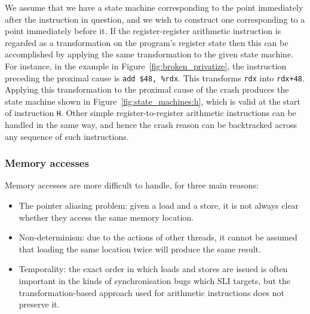 \documentclass[10pt,letter,twocolumn]{sigplanconf}
\newcommand{\editorial}[1]{}
\newcommand{\needCite}{\editorial{need cite}}
\begin{document}
We assume that we have a state machine corresponding to the point
immediately after the instruction in question, and we wish to
construct one corresponding to a point immediately before it.  If the
register-register arithmetic instruction is regarded as a
transformation on the program's register state then this can be
accomplished by applying the same transformation to the given state
machine.  For instance, in the example in
Figure~\ref{fig:broken_privatize}, the instruction preceding the
proximal cause is \verb|add $48, %rdx|.  This transforms \verb|rdx|
into \verb|rdx+48|.  Applying this transformation to the proximal
cause of the crash produces the state machine shown in
Figure~\ref{fig:state_machines:h}, which is valid at the start of
instruction \verb|H|.  Other simple register-to-register arithmetic
instructions can be handled in the same way, and hence the crash
reason can be backtracked across any sequence of such
instructions.\editorial{The reason this works is something to do with
  the underlying category of state machines being linear with respect
  to register-register instructions expressed as homomorphisms, but a)
  that's not really the kind of thing you say in a systems paper, and
  b) I don't understand it well enough to explain it correctly,
  anyway.}

\editorial{Our implementation uses libVEX to decode x86 instructions
  into a sequence of micro-operations which can be used as input to
  this process.} 

\subsubsection{Memory accesses}

Memory accesses are more difficult to handle, for three main reasons:

\begin{itemize}
\item The pointer aliasing problem\needCite{}: given a load and a
  store, it is not always clear whether they access the same memory
  location.
\item Non-determinism: due to the actions of other threads, it cannot
  be assumed that loading the same location twice will produce the
  same result.
\item Temporality: the exact order in which loads and stores are
  issued is often important in the kinds of synchronisation bugs which
  SLI targets, but the transformation-based approach used for
  arithmetic instructions does not preserve it.
\end{itemize}
\end{document}
